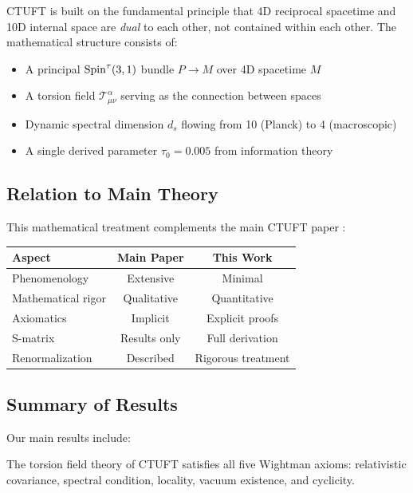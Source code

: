 CTUFT is built on the fundamental principle that 4D reciprocal spacetime and 10D internal space are \textit{dual} to each other, not contained within each other. The mathematical structure consists of:

\begin{itemize}
    \item A principal $\mathrm{Spin}^\tau(3,1)$ bundle $P \to M$ over 4D spacetime $M$
    \item A torsion field $\mathcal{T}^\alpha_{\mu\nu}$ serving as the connection between spaces
    \item Dynamic spectral dimension $d_s$ flowing from 10 (Planck) to 4 (macroscopic)
    \item A single derived parameter $\tau_0 = 0.005$ from information theory
\end{itemize}

\subsection{Relation to Main Theory}

This mathematical treatment complements the main CTUFT paper \cite{wang2026ctuft}:

\begin{center}
\begin{tabular}{|l|c|c|}
\hline
\textbf{Aspect} & \textbf{Main Paper} & \textbf{This Work} \\
\hline
Phenomenology & Extensive & Minimal \\
Mathematical rigor & Qualitative & Quantitative \\
Axiomatics & Implicit & Explicit proofs \\
S-matrix & Results only & Full derivation \\
Renormalization & Described & Rigorous treatment \\
\hline
\end{tabular}
\end{center}

\subsection{Summary of Results}

Our main results include:

\begin{theorem}
The torsion field theory of CTUFT satisfies all five Wightman axioms: relativistic covariance, spectral condition, locality, vacuum existence, and cyclicity.
\end{theorem}

